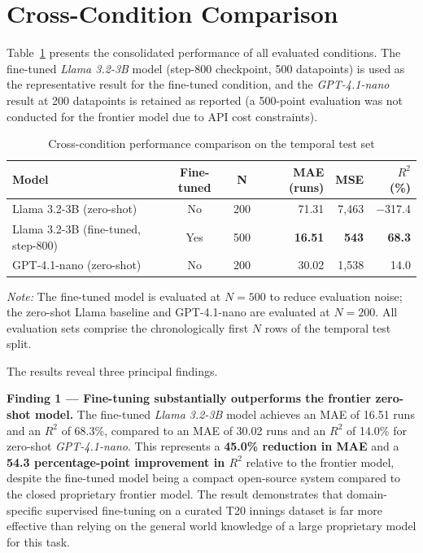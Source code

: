 \section{Cross-Condition Comparison}

Table~\ref{tab:full_comparison} presents the consolidated performance of all evaluated conditions. The fine-tuned \textit{Llama 3.2-3B} model (step-800 checkpoint, 500 datapoints) is used as the representative result for the fine-tuned condition, and the \textit{GPT-4.1-nano} result at 200 datapoints is retained as reported (a 500-point evaluation was not conducted for the frontier model due to API cost constraints).

\begin{table}[ht]
\centering
\caption{Cross-condition performance comparison on the temporal test set}
\label{tab:full_comparison}
\begin{tabular}{p{5.2cm}ccrrr}
\hline
\textbf{Model} & \textbf{Fine-tuned} & \textbf{N} & \textbf{MAE (runs)} & \textbf{MSE} & \textbf{$R^2$ (\%)} \\
\hline
Llama 3.2-3B (zero-shot) & No  & 200 & 71.31 & 7,463 & $-$317.4 \\
Llama 3.2-3B (fine-tuned, step-800) & Yes & 500 & \textbf{16.51} & \textbf{543} & \textbf{68.3} \\
GPT-4.1-nano (zero-shot) & No  & 200 & 30.02 & 1,538 & 14.0 \\
\hline
\end{tabular}
\vspace{4pt}
{\footnotesize \textit{Note:} The fine-tuned model is evaluated at $N = 500$ to reduce evaluation noise; the zero-shot Llama baseline and GPT-4.1-nano are evaluated at $N = 200$. All evaluation sets comprise the chronologically first $N$ rows of the temporal test split.}
\end{table}

The results reveal three principal findings.

\textbf{Finding 1 — Fine-tuning substantially outperforms the frontier zero-shot model.} The fine-tuned \textit{Llama 3.2-3B} model achieves an MAE of 16.51 runs and an $R^2$ of 68.3\%, compared to an MAE of 30.02 runs and an $R^2$ of 14.0\% for zero-shot \textit{GPT-4.1-nano}. This represents a \textbf{45.0\% reduction in MAE} and a \textbf{54.3 percentage-point improvement in $R^2$} relative to the frontier model, despite the fine-tuned model being a compact open-source system compared to the closed proprietary frontier model. The result demonstrates that domain-specific supervised fine-tuning on a curated T20 innings dataset is far more effective than relying on the general world knowledge of a large proprietary model for this task.

